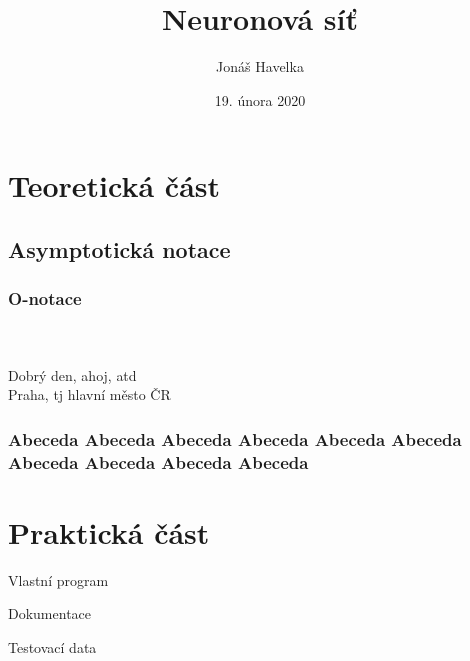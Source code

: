\documentclass[12pt]{report}			%
\author{Jonáš Havelka}
\title{Neuronová síť}
\date{19. února 2020}
\begin{document}
	\mytitlepage						%
	
	
	\abstrakt{
		\lipsum[1]						%
	}{
		\lipsum[1]						%
	}
	
	\podekovani{
		\lipsum[2]						%
	}
	
	\tableofcontents\newpage			%
	
	
	
	
	
	\part{Teoretická část}
	
		\chapter{Asymptotická notace}
			
			\section{O-notace}
				\parencite[see][page 900]{einstein}\\
				\cite{knuthwebsite}\\
				Dobrý den, ahoj, \gls{atd}\\
				Praha, \gls{tj} hlavní město ČR
				
			\section{Abeceda Abeceda Abeceda Abeceda Abeceda Abeceda Abeceda Abeceda Abeceda Abeceda }
		
	\part{Praktická část}



	\appendix
	
	\nocite{*}
    \printbibliography					%
    \printglossary[title={Zkratky}]		%
    
    \begin{prilohy}
    	\item Vlastní program
    	\item Dokumentace
    	\item Testovací data
    \end{prilohy}
\end{document}
